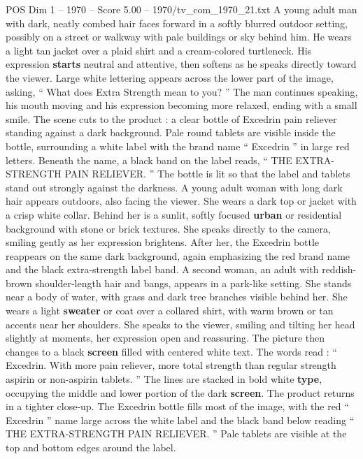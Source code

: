 \begin{textsample}{POS Dim 1 – 1970 – Score 5.00 – 1970/tv\_com\_1970\_21.txt}  \label{ex:f1_pos_066}
A young adult man with dark, neatly combed hair faces forward in a softly blurred outdoor setting, possibly on a street or walkway with pale buildings or sky behind him.
He wears a light tan jacket over a plaid shirt and a cream-colored turtleneck.
His expression \textbf{starts} neutral and attentive, then softens as he speaks directly toward the viewer.
Large white lettering appears across the lower part of the image, asking, “ What does Extra Strength mean to you? ” The man continues speaking, his mouth moving and his expression becoming more relaxed, ending with a small smile.
The scene cuts to the product : a clear bottle of Excedrin pain reliever standing against a dark background.
Pale round tablets are visible inside the bottle, surrounding a white label with the brand name “ Excedrin ” in large red letters.
Beneath the name, a black band on the label reads, “ THE EXTRA-STRENGTH PAIN RELIEVER. ” The bottle is lit so that the label and tablets stand out strongly against the darkness.
A young adult woman with long dark hair appears outdoors, also facing the viewer.
She wears a dark top or jacket with a crisp white collar.
Behind her is a sunlit, softly focused \textbf{urban} or residential background with stone or brick textures.
She speaks directly to the camera, smiling gently as her expression brightens.
After her, the Excedrin bottle reappears on the same dark background, again emphasizing the red brand name and the black extra-strength label band.
A second woman, an adult with reddish-brown shoulder-length hair and bangs, appears in a park-like setting.
She stands near a body of water, with grass and dark tree branches visible behind her.
She wears a light \textbf{sweater} or coat over a collared shirt, with warm brown or tan accents near her shoulders.
She speaks to the viewer, smiling and tilting her head slightly at moments, her expression open and reassuring.
The picture then changes to a black \textbf{screen} filled with centered white text.
The words read : “ Excedrin.
With more pain reliever, more total strength than regular strength aspirin or non-aspirin tablets. ” The lines are stacked in bold white \textbf{type}, occupying the middle and lower portion of the dark \textbf{screen}.
The product returns in a tighter close-up.
The Excedrin bottle fills most of the image, with the red “ Excedrin ” name large across the white label and the black band below reading “ THE EXTRA-STRENGTH PAIN RELIEVER. ” Pale tablets are visible at the top and bottom edges around the label.

\end{textsample}
